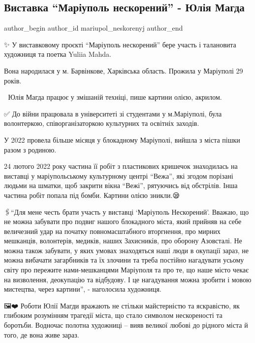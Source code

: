  
 
 
 
 

\subsection{Виставка \enquote{Маріуполь нескорений} - Юлія Магда}
\label{sec:18_08_2023.fb.mariupol_neskorenyj.1.vystavka_mariupol_neskorenyj_julia_magda}

\ifcmt
 author_begin
   author_id mariupol_neskorenyj
 author_end
\fi

✨️ У виставковому проєкті \enquote{Маріуполь нескорений} бере участь і талановита
художниця та поетка Yuliia Mahda. 

Вона народилася у м. Барвінкове, Харківська область.  Прожила у Маріуполі 29
років.

🎨 Юлія Магда працює у змішаній техніці, пише картини олією, акрилом. 

✅️ До війни працювала в університеті зі студентами у м.Маріуполі, була
волонтеркою, співорганізаторкою культурних та освітніх заходів.

У 2022 провела більше місяця у блокадному Маріуполі,  вийшла з міста пішки
разом з родиною.

24 лютого 2022 року частина її робіт з пластикових кришечок знаходилась на
виставці у маріупольському культурному центрі \enquote{Вежа}, які згодом порізані людьми
на шматки, щоб закрити вікна \enquote{Вежі}, рятуючись від обстрілів. Інша частина
робіт попала під бомби. Картини олією зникли.😪

🖇\enquote{Для мене честь брати участь  у виставці \enquote{Маріуполь Нескорений}. Вважаю, що
не можна забувати про подвиг нашого блокадного міста,  який прийняв на себе
величезний удар на початку повномасштабного вторгнення, про мирних мешканців,
волонтерів, медиків, наших Захисників, про оборону Азовсталі. Не можна також
забувати, у яких умовах знаходяться наші люди в окупації зараз, не можна
вибачати загарбників та їх злочини та треба постійно нагадувати усьому світу
про пережите нами-мешканцями Маріуполя та про те, що наше місто чекає на
визволення, деокупацію та відбудову. І це нагадування можна зробити і мовою
мистецтва, через картини}, - наголосила художниця.

 🖼❤️ Роботи Юлії Магди вражають не стільки майстерністю та яскравістю, як
 глибоким розумінням трагедії міста, що стало символом нескореності та
 боротьби.  Водночас полотна художниці – вияв великої любові до рідного міста й
 того, де вона живе зараз.
